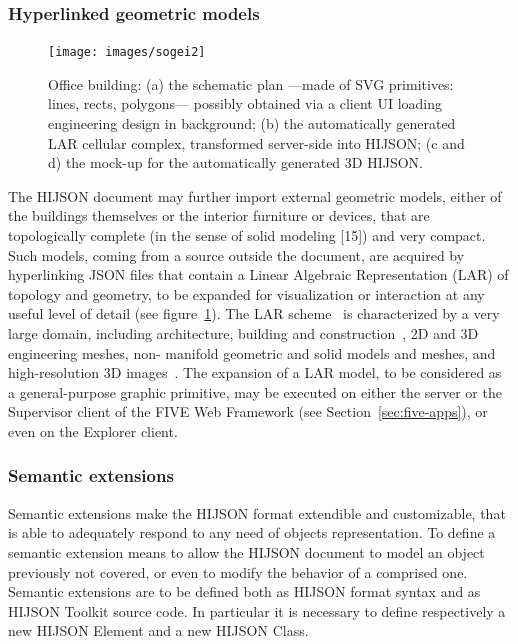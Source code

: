 \documentclass[]{egpubl}
\begin{document}
\subsubsection*{Hyperlinked geometric models}

\begin{figure}[h]
 \centering
 \texttt{[image: images/sogei2]} 
 \caption{Office building: 
 (a) the schematic plan ---made of SVG primitives: 
 lines, rects, polygons--- possibly obtained via a client UI 
 loading engineering design in background;
 (b) the automatically generated LAR cellular complex, transformed 
 server-side into HIJSON; 
 (c and d) the mock-up for the automatically generated 3D HIJSON.
 }
 \label{fig:sogei}
\end{figure}

The HIJSON document may further import external geometric models, either of
the buildings themselves or the interior furniture or devices, that are
topologically complete (in the sense of solid modeling [15]) and very compact.
Such models, coming from a source outside the document, are acquired by
hyperlinking JSON files that contain a Linear Algebraic Representation (LAR)
of topology and geometry, to be expanded for visualization or interaction at
any useful level of detail (see figure~\ref{fig:sogei}). The LAR
scheme~\cite{Dicarlo:2014:TNL:2543138.2543294} is characterized by a very
large domain, including architecture, building and
construction~\cite{paoluzziMS:2014}, 2D and 3D engineering meshes, non-
manifold geometric and solid models and meshes, and high-resolution 3D
images~\cite{cadanda:2015}.  The expansion of a LAR model, to be considered as
a general-purpose graphic primitive, may be executed on either the server or
the Supervisor client of the FIVE Web Framework (see Section~\ref{sec:five-apps}),
or even on the Explorer client.


\subsubsection*{Semantic extensions} Semantic extensions make the HIJSON format
extendible and customizable, that is able to adequately respond to any need of
objects representation. To define a semantic extension means to allow the
HIJSON document to model an object previously not covered, or even to modify
the behavior of a comprised one. Semantic extensions are to be defined both as
HIJSON format syntax and as HIJSON Toolkit source code. In particular it is
necessary to define respectively a new HIJSON Element and a new HIJSON Class.
\end{document}
